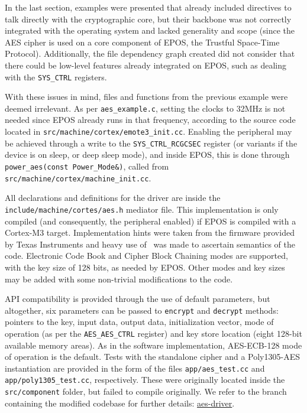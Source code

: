 \documentclass{../sftex/sftex}
\begin{document}
In the last section, examples were presented that already included directives
to talk directly with the cryptographic core, but their backbone was not
correctly integrated with the operating system and lacked generality and scope
(since the AES cipher is used on a core component of EPOS, the Trustful
Space-Time Protocol). Additionally, the file dependency graph created did not
consider that there could be low-level features already integrated on EPOS,
such as dealing with the \verb!SYS_CTRL! registers.

With these issues in mind, files and functions from the previous example were
deemed irrelevant. As per \verb!aes_example.c!, setting the clocks to 32MHz is
not needed since EPOS already runs in that frequency, according to the source
code located in \verb!src/machine/cortex/emote3_init.cc!. Enabling the
peripheral may be achieved through a write to the \verb!SYS_CTRL_RCGCSEC!
register (or variants if the device is on sleep, or deep sleep mode), and
inside EPOS, this is done through \verb!power_aes(const Power_Mode&)!, called
from \verb!src/machine/cortex/machine_init.cc!.

All declarations and definitions for the driver are inside the
\verb!include/machine/cortes/aes.h! mediator file. This implementation is only
compiled (and consequently, the peripheral enabled) if EPOS is compiled with a
Cortex-M3 target. Implementation hints were taken from the firmware provided by
Texas Instruments and heavy use of~\cite{Texas:report:2013:may} was made to
ascertain semantics of the code. Electronic Code Book and Cipher Block Chaining
modes are supported, with the key size of 128 bits, as needed by EPOS\@. Other
modes and key sizes may be added with some non-trivial modifications to the
code.

API compatibility is provided through the use of default parameters, but
altogether, six parameters can be passed to \verb!encrypt! and \verb!decrypt!
methods: pointers to the key, input data, output data, initialization vector,
mode of operation (as per the \verb!AES_AES_CTRL! register) and key store
location (eight 128-bit available memory areas). As in the software
implementation, AES-ECB-128 mode of operation is the default. Tests with the
standalone cipher and a Poly1305-AES instantiation are provided in the form of
the files \verb!app/aes_test.cc! and \verb!app/poly1305_test.cc!, respectively.
These were originally located inside the \verb!src/component! folder, but
failed to compile originally. We refer to the branch containing the modified
codebase for further details:
\href{https://epos.lisha.ufsc.br/svn/makers/aes-driver/}{aes-driver}.



\end{document}
